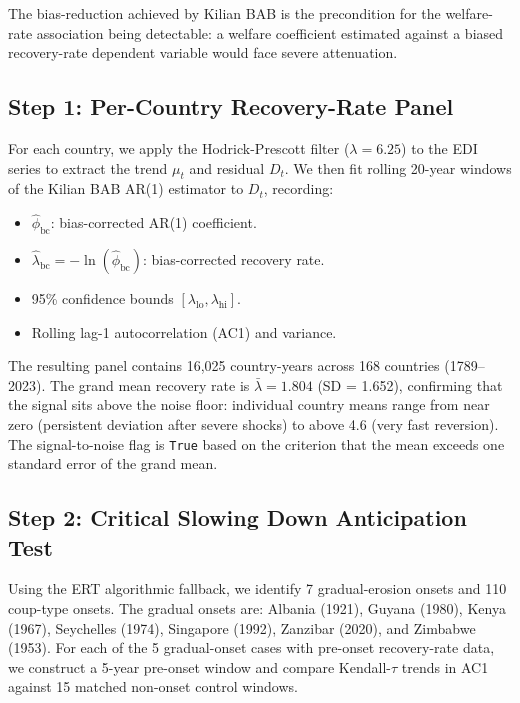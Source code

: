 \documentclass[11pt,letterpaper]{article}
\begin{document}
The bias-reduction achieved by Kilian BAB is the precondition for the welfare-rate association being detectable: a
welfare coefficient estimated against a biased recovery-rate dependent variable would face severe attenuation.

\subsection{Step 1: Per-Country Recovery-Rate Panel}

For each country, we apply the Hodrick-Prescott filter ($\lambda = 6.25$) to the EDI series to extract the trend
$\mu_t$ and residual $D_t$. We then fit rolling 20-year windows of the Kilian BAB AR(1) estimator to $D_t$, recording:

\begin{itemize}
  \item $\hat{\phi}_{\text{bc}}$: bias-corrected AR(1) coefficient.
  \item $\hat{\lambda}_{\text{bc}} = -\ln(\hat{\phi}_{\text{bc}})$: bias-corrected recovery rate.
  \item 95\% confidence bounds $[\lambda_{\text{lo}}, \lambda_{\text{hi}}]$.
  \item Rolling lag-1 autocorrelation (AC1) and variance.
\end{itemize}

The resulting panel contains 16,025 country-years across 168 countries (1789--2023). The grand mean recovery rate is
$\bar{\lambda} = 1.804$ (SD = 1.652), confirming that the signal sits above the noise floor: individual country means
range from near zero (persistent deviation after severe shocks) to above 4.6 (very fast reversion). The
signal-to-noise flag is \texttt{True} based on the criterion that the mean exceeds one standard error of the grand mean.

\subsection{Step 2: Critical Slowing Down Anticipation Test}

Using the ERT algorithmic fallback, we identify 7 gradual-erosion onsets and 110 coup-type onsets. The gradual onsets
are: Albania (1921), Guyana (1980), Kenya (1967), Seychelles (1974), Singapore (1992), Zanzibar (2020), and Zimbabwe
(1953). For each of the 5 gradual-onset cases with pre-onset recovery-rate data, we construct a 5-year pre-onset window
and compare Kendall-$\tau$ trends in AC1 against 15 matched non-onset control windows.
\end{document}

